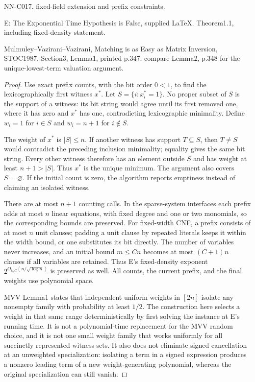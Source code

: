NN-C017. fixed-field extension and prefix constraints.

E: The Exponential Time Hypothesis is False, supplied LaTeX. Theorem1.1, including fixed-density statement.

Mulmuley--Vazirani--Vazirani, Matching is as Easy as Matrix Inversion, STOC1987. Section3, Lemma1, printed p.347; compare Lemma2, p.348 for the unique-lowest-term valuation argument.

\begin{proof}
Use exact prefix counts, with the bit order $0<1$, to find the lexicographically first witness $x^*$. Let $S=\{i:x_i^*=1\}$. No proper subset of $S$ is the support of a witness: its bit string would agree until its first removed one, where it has zero and $x^*$ has one, contradicting lexicographic minimality. Define $w_i=1$ for $i\in S$ and $w_i=n+1$ for $i\notin S$.

The weight of $x^*$ is $|S|\leq n$. If another witness has support $T\subseteq S$, then $T\ne S$ would contradict the preceding inclusion minimality; equality gives the same bit string. Every other witness therefore has an element outside $S$ and has weight at least $n+1>|S|$. Thus $x^*$ is the unique minimum. The argument also covers $S=\varnothing$. If the initial count is zero, the algorithm reports emptiness instead of claiming an isolated witness.

There are at most $n+1$ counting calls. In the sparse-system interfaces each prefix adds at most $n$ linear equations, with fixed degree and one or two monomials, so the corresponding bounds are preserved. For fixed-width CNF, a prefix consists of at most $n$ unit clauses; padding a unit clause by repeated literals keeps it within the width bound, or one substitutes its bit directly. The number of variables never increases, and an initial bound $m\leq Cn$ becomes at most $(C+1)n$ clauses if all variables are retained. Thus E's fixed-density exponent $2^{O_{k,C}(n/\sqrt{\log n})}$ is preserved as well. All counts, the current prefix, and the final weights use polynomial space.

MVV Lemma1 states that independent uniform weights in $[2n]$ isolate any nonempty family with probability at least $1/2$. The construction here selects a weight in that same range deterministically by first solving the instance at E's running time. It is not a polynomial-time replacement for the MVV random choice, and it is not one small weight family that works uniformly for all succinctly represented witness sets. It also does not eliminate signed cancellation at an unweighted specialization: isolating a term in a signed expression produces a nonzero leading term of a new weight-generating polynomial, whereas the original specialization can still vanish.
\end{proof}
